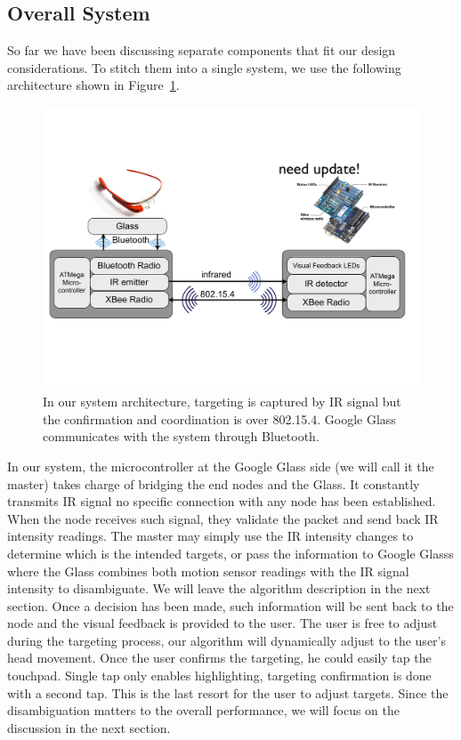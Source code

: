 \subsection{Overall System}
\label{sec:overall-system}
So far we have been discussing separate components that fit our design considerations. To stitch them into a single system, we use the following architecture shown in Figure~\ref{fig:architecture}.

\begin{figure}[t]
\centering
\includegraphics[width=0.9\columnwidth]{figures/architecture.pdf}
\caption{In our system architecture, targeting is captured by IR signal but the confirmation and coordination is over 802.15.4. Google Glass communicates with the system through Bluetooth.}
\label{fig:architecture}
\end{figure}

In our system, the microcontroller at the Google Glass side (we will call it the master) takes charge of bridging the end nodes and the Glass. It constantly transmits IR signal no specific connection with any node has been established. When the node receives such signal, they validate the packet and send back IR intensity readings. The master may simply use the IR intensity changes to determine which is the intended targets, or pass the information to Google Glasss where the Glass combines both motion sensor readings with the IR signal intensity to disambiguate. We will leave the algorithm description in the next section. Once a decision has been made, such information will be sent back to the node and the visual feedback is provided to the user. The user is free to adjust during the targeting process, our algorithm will dynamically adjust to the user's head movement. Once the user confirms the targeting, he could easily tap the touchpad. Single tap only enables highlighting, targeting confirmation is done with a second tap. This is the last resort for the user to adjust targets. Since the disambiguation matters to the overall performance, we will focus on the discussion in the next section.

